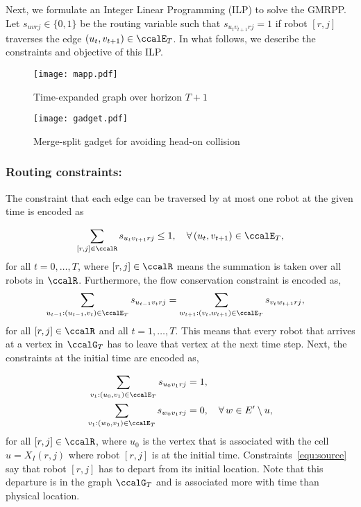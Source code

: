 \documentclass[Afour,sageh,times]{sagej}
\begin{document}
{{{Next, we formulate an Integer Linear Programming (ILP) to solve the GMRPP. Let $s_{uvrj} \in\{0,1\}$ be the routing variable such that $s_{u_{t}v_{t+1}rj} = 1$ if robot $[r,j]$ traverses the edge $(u_t,v_{t+1}) \in \ccalE_T$. In what follows, we describe the constraints and objective of this ILP.

\begin{figure}[t]
  \centering
  \texttt{[image: mapp.pdf]}
  \caption{Time-expanded graph over horizon $T+1$}
  \label{fig:mapp}
\end{figure}

\begin{figure}[t]
  \centering
  \texttt{[image: gadget.pdf]}
  \caption{Merge-split gadget for avoiding head-on collision}
  \label{fig:gadget}
\end{figure}
\subsubsection{Routing constraints:}
The constraint that each edge can be traversed by at most one robot at the given time is encoded as}
\begingroup\makeatletter{}\check@mathfonts
\def\maketag@@@#1{\hbox{\m@th\normalsize\normalfont#1}}%
\begin{align}
  \sum_{[r,j] \in \ccalR} s_{u_t v_{t+1}rj} \leq 1, \quad \forall \,(u_t,v_{t+1}) \in \ccalE_T,
\end{align}
\endgroup
for all $t=0,\ldots, T$, where $[r,j]\in\ccalR$ means the summation is taken over all robots in $\ccalR$. Furthermore, the flow conservation constraint is encoded as,
\begingroup\makeatletter\def\f@size{10}\check@mathfonts
\def\maketag@@@#1{\hbox{\m@th\normalsize\normalfont#1}}%
\begingroup
  \begin{align}\label{equ:flow}
  \sum_{u_{t-1}:(u_{t-1}, v_t) \in \ccalE_T}   s_{u_{t-1} v_t rj} &  =   \sum_{w_{t+1}:(v_t, w_{t+1}) \in \ccalE_T} s_{v_t w_{t+1} rj},
  \end{align}
\endgroup
for all $[r,j]\in \ccalR$ and all $t=1,\ldots,T$. This means that every robot that arrives at a vertex in $\ccalG_T$ has to leave that vertex at the next time step. Next, the constraints at the initial time are encoded as,
\begingroup\makeatletter\def\f@size{10}\check@mathfonts
\def\maketag@@@#1{\hbox{\m@th\normalsize\normalfont#1}}%
\begingroup

\begin{subequations}\label{equ:source}
  \begin{align}
    \sum_{v_1:(u_0, v_1) \in \ccalE_T} s_{u_0v_1 rj} &  = 1,  \\
    \sum_{v_1:(w_0, v_1) \in \ccalE_T} s_{w_0v_1 rj} & = 0, \quad \forall\, w \in E'\setminus u,
  \end{align}
\end{subequations}
\endgroup
for all $[r,j]\in \ccalR$, where $u_0$ is the vertex that is associated with the cell $u = X_I(r,j)$ where robot $[r,j]$ is at the initial time. Constraints~\eqref{equ:source} say that robot $[r,j]$ has to depart from its initial location. Note that this departure is in the graph $\ccalG_T$ and is associated more with time than physical location.
}}
\end{document}
